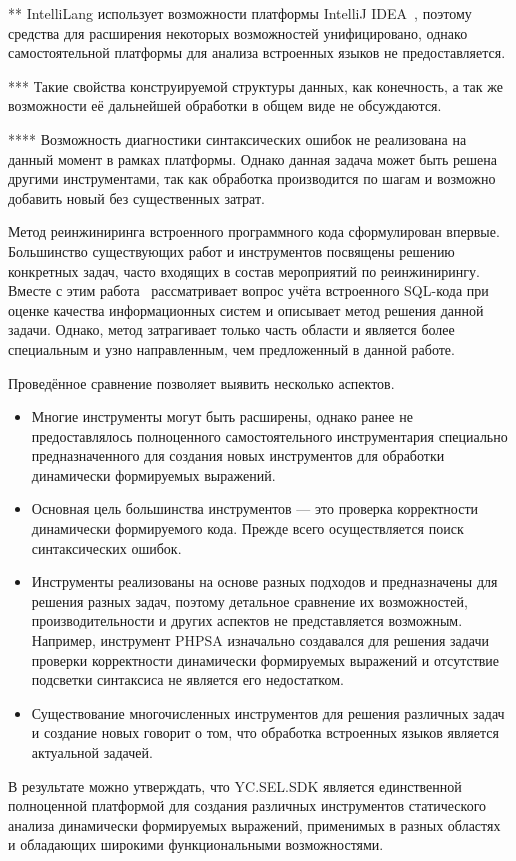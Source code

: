 \begin{table} [h]
\begin{threeparttable}
{\begin{tablenotes}
            \item[**] IntelliLang использует возможности платформы IntelliJ IDEA~\cite{IDEA}, поэтому средства для расширения некоторых возможностей унифицировано, однако самостоятельной платформы для анализа встроенных языков не предоставляется.
            \item[***] Такие свойства конструируемой структуры данных, как конечность, а так же возможности её дальнейшей обработки в общем виде не обсуждаются.
            \item[****] Возможность диагностики синтаксических ошибок не реализована на данный момент в рамках платформы. Однако данная задача может быть решена другими инструментами, так как обработка производится по шагам и возможно добавить новый без существенных затрат.
  \end{tablenotes}    }
  \end{threeparttable}
\end{table}

Метод реинжиниринга встроенного программного кода сформулирован впервые. Большинство существующих работ и инструментов посвящены решению конкретных задач, часто входящих в состав мероприятий по реинжинирингу. 
Вместе с этим работа~\cite{DSQLQualityMesure} рассматривает вопрос учёта встроенного SQL-кода при оценке качества информационных систем и описывает метод решения данной задачи. Однако, метод
затрагивает только часть области и является более специальным и узно направленным, чем предложенный в данной работе. 

Проведённое сравнение позволяет выявить несколько аспектов.
\begin{itemize}
    \item Многие инструменты могут быть расширены, однако ранее не предоставлялось полноценного самостоятельного инструментария специально предназначенного для создания новых инструментов для обработки динамически формируемых выражений.
    \item Основная цель большинства инструментов --- это проверка корректности динамически формируемого кода. Прежде всего осуществляется поиск синтаксических ошибок.
    \item Инструменты реализованы на основе разных подходов и предназначены для решения разных задач, поэтому детальное сравнение их возможностей, производительности и других аспектов не представляется возможным. Например, инструмент PHPSA изначально создавался для решения задачи проверки корректности динамически формируемых выражений и отсутствие подсветки синтаксиса не является его недостатком.
    \item Существование многочисленных инструментов для решения различных задач и создание новых говорит о том, что обработка встроенных языков является актуальной задачей.
\end{itemize}

В результате можно утверждать, что YC.SEL.SDK является единственной полноценной платформой для создания различных инструментов статического анализа динамически формируемых выражений, применимых в разных областях и обладающих широкими функциональными возможностями.


